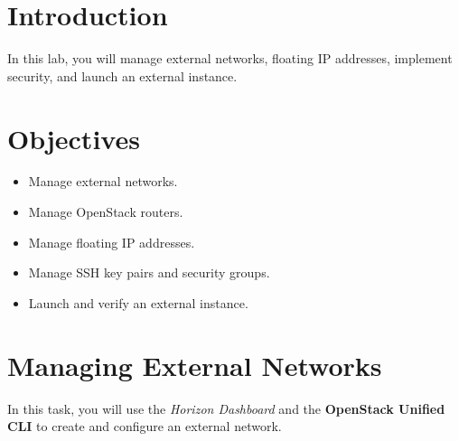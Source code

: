 \documentclass[letterpaper, 12pt]{article}
\begin{document}

\section*{Introduction}
\label{sec:introduction}
In this lab, you will manage external networks, floating IP addresses, implement security, and launch an external
instance.

\section*{Objectives}
\label{sec:objectives}
\begin{itemize}[itemsep=0pt]
    \item Manage external networks.
    \item Manage OpenStack routers.
    \item Manage floating IP addresses.
    \item Manage SSH key pairs and security groups.
    \item Launch and verify an external instance.
\end{itemize}
\clearpage

\labsettings

\section{Managing External Networks}
\label{sec:managing_external_networks}
In this task, you will use the \textit{Horizon Dashboard} and the \textbf{OpenStack Unified CLI} to create and configure
an external network.
\end{document}
